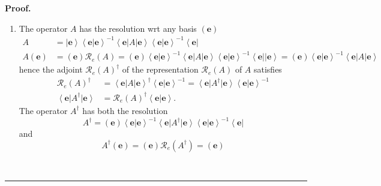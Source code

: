 \documentclass[aps,preprint]{revtex4}%
\newenvironment{proof}[1][Proof]{\noindent\textbf{#1.} }{\ \rule{0.5em}{0.5em}}
\begin{document}
\begin{proof}
\begin{enumerate}
\item The operator $A$ has the resolution wrt any basis $\left(
\mathbf{e}\right)  $
\begin{align}
A  &  =\left\vert \mathbf{e}\right\rangle \left\langle \left.  \mathbf{e}%
\right\vert \mathbf{e}\right\rangle ^{-1}\left\langle \mathbf{e}\right\vert
A\left\vert \mathbf{e}\right\rangle \left\langle \left.  \mathbf{e}\right\vert
\mathbf{e}\right\rangle ^{-1}\left\langle \mathbf{e}\right\vert \\
A\left(  \mathbf{e}\right)   &  =\left(  \mathbf{e}\right)  \mathcal{R}%
_{e}\left(  A\right)  =\left(  \mathbf{e}\right)  \left\langle \left.
\mathbf{e}\right\vert \mathbf{e}\right\rangle ^{-1}\left\langle \mathbf{e}%
\right\vert A\left\vert \mathbf{e}\right\rangle \left\langle \left.
\mathbf{e}\right\vert \mathbf{e}\right\rangle ^{-1}\left\langle \mathbf{e}%
\right\vert \left\vert \mathbf{e}\right\rangle =\left(  \mathbf{e}\right)
\left\langle \left.  \mathbf{e}\right\vert \mathbf{e}\right\rangle
^{-1}\left\langle \mathbf{e}\right\vert A\left\vert \mathbf{e}\right\rangle
\end{align}
hence the adjoint $\mathcal{R}_{e}\left(  A\right)  ^{\dagger}$ of the
representation $\mathcal{R}_{e}\left(  A\right)  $ of $A$ satisfies
\begin{align}
\mathcal{R}_{e}\left(  A\right)  ^{\dagger}  &  =\left\langle \mathbf{e}%
\right\vert A\left\vert \mathbf{e}\right\rangle ^{\dagger}\left\langle \left.
\mathbf{e}\right\vert \mathbf{e}\right\rangle ^{-1}=\left\langle
\mathbf{e}\right\vert A^{\dagger}\left\vert \mathbf{e}\right\rangle
\left\langle \left.  \mathbf{e}\right\vert \mathbf{e}\right\rangle ^{-1}\\
\left\langle \mathbf{e}\right\vert A^{\dagger}\left\vert \mathbf{e}%
\right\rangle  &  =\mathcal{R}_{e}\left(  A\right)  ^{\dagger}\left\langle
\left.  \mathbf{e}\right\vert \mathbf{e}\right\rangle .
\end{align}
The operator $A^{\dagger}$ has both the resolution%
\begin{equation}
A^{\dagger}=\left(  \mathbf{e}\right)  \left\langle \left.  \mathbf{e}%
\right\vert \mathbf{e}\right\rangle ^{-1}\left\langle \mathbf{e}\right\vert
A^{\dagger}\left\vert \mathbf{e}\right\rangle \left\langle \left.
\mathbf{e}\right\vert \mathbf{e}\right\rangle ^{-1}\left\langle \mathbf{e}%
\right\vert
\end{equation}
and
\begin{equation}
A^{\dagger}\left(  \mathbf{e}\right)  =\left(  \mathbf{e}\right)
\mathcal{R}_{e}\left(  A^{\dagger}\right)  =\left(  \mathbf{e}\right)

\end{equation}
\end{enumerate}
\end{proof}
\end{document}
